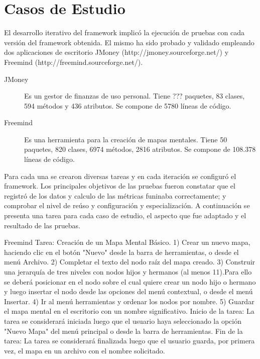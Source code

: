 \section{Casos de Estudio}
\label{sec:casos_de_estudio}
 
 El desarrollo iterativo del framework implicó la ejecución de pruebas con cada versión del framework obtenida. El mismo ha sido probado y validado empleando dos aplicaciones de escritorio JMoney (http://jmoney.sourceforge.net/) y Freemind (http://freemind.sourceforge.net/). 
 
\begin{description}

\item[JMoney]

Es un gestor de finanzas de uso personal. Tiene ??? paquetes, 83 clases, 594 métodos y 436 atributos. Se compone de 5780 líneas de código. 

\item[Freemind]

Es una herramienta para la creación de mapas mentales. Tiene 50 paquetes, 820 clases, 6974 métodos, 2816 atributos. Se compone de 108.378 líneas de código. 
\end{description}

Para cada una se crearon diversas tareas y en cada iteración se configuró el framework. Los principales objetivos de las pruebas fueron constatar que el registró de los datos y calculo de las métricas funinaba correctamente; y comprobar el nivel de reúso y configuración y especialización. A continuación se presenta una tarea para cada caso de estudio, el aspecto que fue adaptado  y el resultado de las pruebas.

Freemind
Tarea: Creación de un Mapa Mental Básico.
1) Crear un nuevo mapa, haciendo clic en el botón "Nuevo" desde la barra de herramientas, o desde el menú Archivo. 
2) Completar el texto del nodo raíz del mapa creado.
3) Construir una jerarquía de tres niveles con nodos hijos y hermanos (al menos 11).Para ello se deberá posicionar en el nodo sobre el cual quiere crear un nodo hijo o hermano y luego insertar el nodo desde las opciones del menú contextual, o desde el menú Insertar.
4) Ir al menú herramientas y ordenar los nodos por nombre.
5) Guardar el mapa mental en el escritorio con un nombre significativo.
Inicio de la tarea: La tarea se considerará iniciada luego que el usuario haya seleccionado la opción "Nuevo Mapa" del menú principal o desde la barra de herramientas.
Fin de la tarea: La tarea se considerará finalizada luego que el usuario guarda, por primera vez, el mapa en un archivo con el nombre solicitado. 

